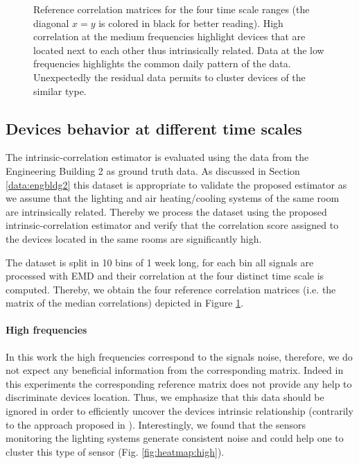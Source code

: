 \begin{figure}[t!]
\caption{Reference correlation matrices for the four time scale ranges (the diagonal $x=y$ is colored in black for better reading). High correlation at the medium frequencies highlight devices that are located next to each other thus intrinsically related. Data at the low frequencies highlights the common daily pattern of the data. Unexpectedly the residual data permits to cluster devices of the similar type.}
\label{fig:heatmap}
\end{figure}

\subsection{Devices behavior at different time scales}
The intrinsic-correlation estimator is evaluated using the data from the Engineering Building 2 as ground truth data.
As discussed in Section \ref{data:engbldg2} this dataset is appropriate to validate the proposed estimator as we assume that the lighting and air heating/cooling systems of the same room are intrinsically related.
Thereby we process the dataset using the proposed intrinsic-correlation estimator and verify that the correlation score assigned to the devices located in the same rooms are significantly high.

The dataset is split in 10 bins of 1 week long, for each bin all signals are processed with EMD and their correlation at the four distinct time scale is computed. 
Thereby, we obtain the four reference correlation matrices (i.e. the matrix of the median correlations) depicted in Figure \ref{fig:heatmap}.

\paragraph{High frequencies}
In this work the high frequencies correspond to the signals noise, therefore, we do not expect any beneficial information from the corresponding matrix.
Indeed in this experiments the corresponding reference matrix does not provide any help to discriminate devices location.
Thus, we emphasize that this data should be ignored in order to efficiently uncover the devices intrinsic relationship (contrarily to the approach proposed in \cite{romain:iotapp12}).
Interestingly, we found that the sensors monitoring the lighting systems generate consistent noise and could help one to cluster this type of sensor (Fig. \ref{fig:heatmap:high}).
  
